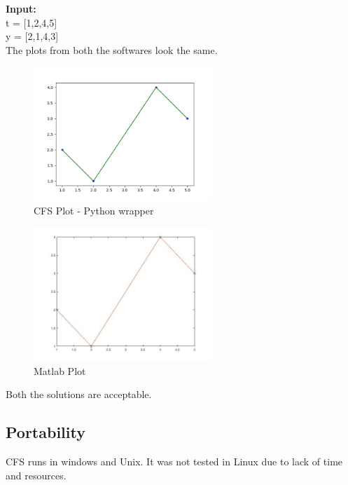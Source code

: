 \documentclass[12pt, titlepage]{article}
\newcommand{\famname}{CFS}
\begin{document}
\noindent \textbf{Input:}\\
t = [1,2,4,5]\\
y = [2,1,4,3]\\

The plots from both the softwares look the same. 

\begin{figure}[h!]
	\begin{center}
		\includegraphics[width=0.6\textwidth]{PythonPlot.png}
		\caption{CFS Plot - Python wrapper}
		\label{Fig_Python} 
	\end{center}
\end{figure}

\begin{figure}[h!]
	\begin{center}
		\includegraphics[width=0.6\textwidth]{Matlab.jpg}
		\caption{Matlab Plot}
		\label{Fig_Matlab} 
	\end{center}
\end{figure}

Both the solutions are acceptable.
		
\subsection{Portability}

\famname{} runs in windows and Unix. It was not tested in Linux due to 
lack of 
time and resources.
\end{document}
